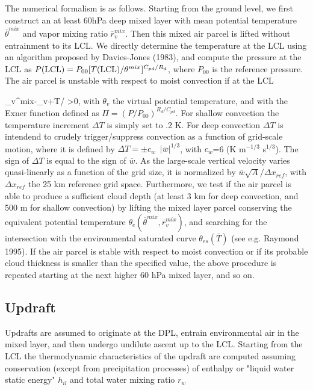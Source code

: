 The numerical formalism is as follows.
Starting from the ground level, we first
construct an at least 60hPa deep mixed layer with mean potential
temperature
$\overline{\theta}^{mix}$ and vapor mixing ratio $\overline{r}_v^{mix}$.
Then this mixed air parcel is lifted
without entrainment to its LCL.
We directly determine the temperature at the LCL using an
algorithm proposed by Davies-Jones (1983), and
compute the pressure at the LCL as
$P({\rm LCL})=P_{00}[T({\rm LCL})/\theta^{mix}]^{C_{pd}/R_d}$, where
$P_{00}$ is the reference pressure.
The air parcel is unstable with respect to moist
convection if at the LCL

\beq
\overline{\theta}_v^{mix}-\overline{\theta}_v+\Delta T/\Pi\,\,>0,
\label{dt}
\eeq
\noindent
with $\theta_v$ the virtual potential temperature, and
with the Exner function defined as $\Pi=(P/P_{00})^{R_d/C_{pd}}$. For shallow
convection the temperature increment $\Delta T$ is simply set to .2 K. For
deep convection $\Delta T$ is intendend to crudely trigger/suppress
convection as a function of grid-scale motion, where it is defined by
$\Delta T = \pm c_{w}\,\,\,\vert \overline{w}\vert^{1/3}$,
with $c_w$=6 (K  m$^{-1/3}$ s$^{1/3}$).  The sign of $\Delta T$ is
equal to the sign of $\overline{w}$. As the large-scale vertical
velocity varies quasi-linearly as a function of the grid size, it
is normalized by $\overline{w}
\sqrt{A}/\Delta x_{ref}$,  with
$\Delta x_{ref}$ the 25 km reference grid space. Furthermore,
we test if the air parcel is able to produce a sufficient cloud depth
(at least 3 km for deep convection, and 500 m for shallow convection) by
lifting the  mixed layer parcel conserving the equivalent potential temperature
$\theta_e(\overline{\theta}^{mix},\overline{r}_v^{mix})$, and searching for the
intersection with the environmental saturated curve
$\theta_{es}(\overline{T})$ (see e.g. Raymond 1995).
If the air parcel is stable with
respect to moist convection or if its probable cloud thickness
is smaller than the specified value, the above procedure
is repeated starting at the next higher 60 hPa mixed layer, and so on.


\subsection{Updraft}

Updrafts are assumed to originate at the DPL, entrain environmental air
in the mixed layer, and then undergo undilute ascent up to the LCL.
Starting from the LCL the thermodynamic characteristics of the
updraft  are computed assuming conservation (except from
precipitation processes)
of enthalpy or "liquid water static energy" $h_{il}$ and total
water mixing ratio $r_w$


